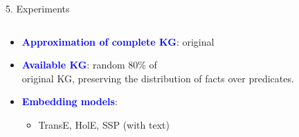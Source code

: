 \documentclass[t,final,hyperref={pdfpagelabels=true}]{beamer}
\newcommand{\bl}[1]{\textcolor{blue}{#1}}
\begin{document}
\begin{frame}
\begin{columns}[t]
\begin{column}{0.5\textwidth}
\begin{block}{5. Experiments}
				\begin{columns}
					\begin{column}{1.02\textwidth}
						\vspace{-1.7cm}
						\small{\begin{itemize}
							\item \bl{\textbf{Approximation of complete KG}}: original																		
							\item \bl{\textbf{Available KG}}: random 80\% of \\ original KG, preserving the distribution of facts over predicates.											\item \bl{\textbf{Embedding models}}: 
							\begin{itemize}
								\medskip
								\item TransE, HolE, SSP (with text)
							\end{itemize}
							\bigskip						
							\end{itemize}}
											

\end{column}
\end{columns}
\end{block}
\end{column}
\end{columns}
\end{frame}
\end{document}
